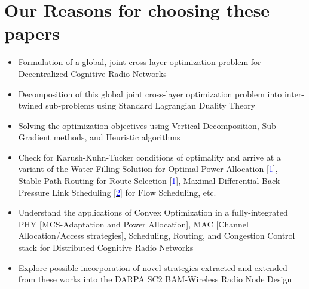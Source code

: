 \documentclass[12pt, draftcls, onecolumn]{IEEEtran}
\begin{document}
\section{Our Reasons for choosing these papers}
\begin{itemize}
    \item Formulation of a global, joint cross-layer optimization problem for Decentralized Cognitive Radio Networks
    \item Decomposition of this global joint cross-layer optimization problem into inter-twined sub-problems using Standard Lagrangian Duality Theory
    \item Solving the optimization objectives using Vertical Decomposition, Sub-Gradient methods, and Heuristic algorithms
    \item Check for Karush-Kuhn-Tucker conditions of optimality and arrive at a variant of the Water-Filling Solution for Optimal Power Allocation \href{http://ieeexplore.ieee.org/stamp/stamp.jsp?tp=&arnumber=7859326&isnumber=7859429}{[\textcolor{blue}{1}]}, Stable-Path Routing for Route Selection \href{http://ieeexplore.ieee.org/stamp/stamp.jsp?tp=&arnumber=7859326&isnumber=7859429}{[\textcolor{blue}{1}]}, Maximal Differential Back-Pressure Link Scheduling \href{http://ieeexplore.ieee.org/stamp/stamp.jsp?tp=&arnumber=6881740&isnumber=7180482}{[\textcolor{blue}{2}]} for Flow Scheduling, etc.
    \item Understand the applications of Convex Optimization in a fully-integrated PHY [MCS-Adaptation and Power Allocation], MAC [Channel Allocation/Access strategies], Scheduling, Routing, and Congestion Control stack for Distributed Cognitive Radio Networks
    \item Explore possible incorporation of novel strategies extracted and extended from these works into the DARPA SC2 BAM-Wireless Radio Node Design
\end{itemize}
\end{document}
